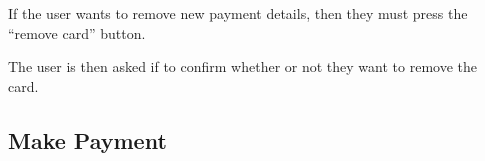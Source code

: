 \begin{minipage}{\textwidth}
  \centering
  \begin{minipage}[t]{4.6cm}
    \vspace{0pt}
    \centering
    \begin{minipage}{4.4cm}
      If the user wants to remove new payment details, then they must press the ``remove card'' button.
    \end{minipage}
  \end{minipage}
  \begin{minipage}[t]{4.6cm}
    \vspace{0pt}
    \centering
    \begin{minipage}{4.4cm}
      The user is then asked if to confirm whether or not they want to remove the card.
    \end{minipage}
  \end{minipage}
\end{minipage}

\clearpage

\subsection{Make Payment}

